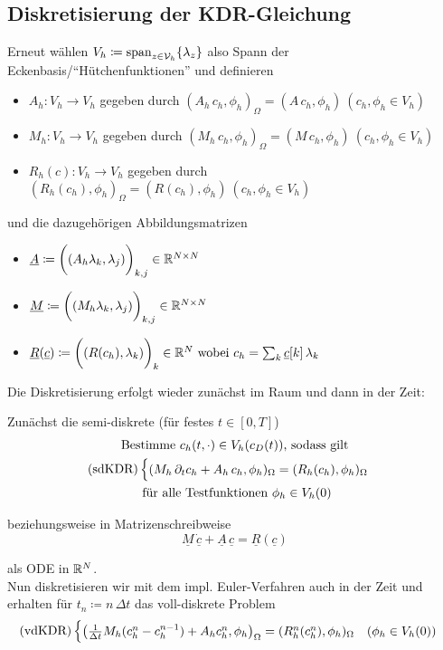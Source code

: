 \subsection{Diskretisierung der KDR-Gleichung}
Erneut wählen $ V_h \coloneqq \operatorname{span}_{z \in \mathcal{V}_h} \{ \lambda_z \} $ also Spann der Eckenbasis/\enquote{Hütchenfunktionen} und definieren
\begin{itemize}
	\item $ A_h: V_h \to V_h $ gegeben durch $ (A_h \, c_h, \phi_h)_\Omega = (A \, c_h, \phi_h) \ (c_h, \phi_h \in V_h)$
	\item $ M_h: V_h \to V_h $ gegeben durch $ (M_h \, c_h, \phi_h)_\Omega = (M \, c_h, \phi_h) \ (c_h, \phi_h \in V_h)$
	\item $ R_h(c): V_h \to V_h $ gegeben durch $ (R_h(c_h), \phi_h)_\Omega = (R(c_h), \phi_h) \ (c_h, \phi_h \in V_h)$
\end{itemize}
und die dazugehörigen Abbildungsmatrizen
\begin{itemize}
	\item $\underline{A} \coloneqq \bigg( (A_h \lambda_k, \lambda_j) \bigg)_{k,j} \in \mathbb{R}^{N \times N}$
	\item $\underline{M} \coloneqq \bigg( (M_h \lambda_k, \lambda_j) \bigg)_{k,j} \in \mathbb{R}^{N \times N}$
	\item $ \underline{R}(\underline{c}) \coloneqq \bigg( (R(c_h),\lambda_k) \bigg)_k \in \mathbb{R}^N \text{ wobei } c_h = \sum_k \underline{c}[k] \, \lambda_k $
\end{itemize}
Die Diskretisierung erfolgt wieder zunächst im Raum und dann in der Zeit:

Zunächst die semi-diskrete  (für festes $ t \in [0,T]$) 
\begin{gather*}
	\text{Bestimme } c_h(t,\cdot) \in V_h(c_D(t)) \text{, sodass gilt}\\
	\operatorname{(sdKDR)}\begin{cases}
		(M_h \, \partial_t c_h + A_h \, c_h, \phi_h)_\Omega = (R_h(c_h), \phi_h)_\Omega
	\end{cases}\\
	\text{ für alle Testfunktionen } \phi_h \in V_h(0) 
\end{gather*}

beziehungsweise in Matrizenschreibweise 
\[ \underline{M} \, \underline{\dot{c}} + \underline{A} \, \underline{c} = \underline{R}(\underline{c})  \]

als ODE in $ \mathbb{R}^N $.\\
Nun diskretisieren wir mit dem impl. Euler-Verfahren auch in der Zeit und erhalten für $ t_n \coloneqq n \, \Delta t  $ das voll-diskrete Problem
\begin{gather*}
\operatorname{(vdKDR)} \begin{cases}
	\left( \frac{1}{\Delta t} M_h(c_h^n - c_h^{n-1}) + A_h c_h^n, \phi_h \right)_\Omega = (R_h^n(c_h^n),\phi_h)_\Omega \quad (\phi_h \in V_h(0))
\end{cases}
\end{gather*}

